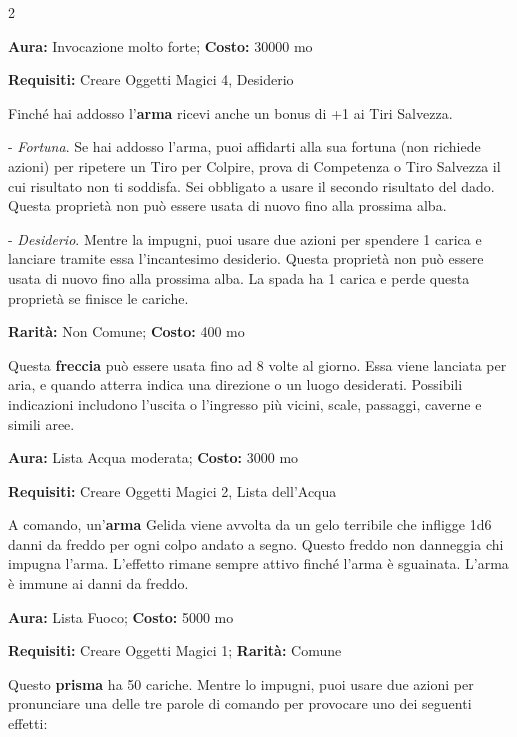 \begin{multicols}{2}

\textbf{Aura:} Invocazione molto forte; \textbf{Costo:} 30000 mo

\textbf{Requisiti:} Creare Oggetti Magici 4, Desiderio

Finché hai addosso l'\textbf{arma} ricevi anche un bonus di +1 ai Tiri Salvezza.

- \emph{Fortuna}. Se hai addosso l'arma, puoi affidarti alla sua fortuna (non richiede azioni) per ripetere un Tiro per Colpire, prova di Competenza o Tiro Salvezza il cui risultato non ti soddisfa. Sei obbligato a usare il secondo risultato del dado. Questa proprietà non può essere usata di nuovo fino alla prossima alba.

- \emph{Desiderio}. Mentre la impugni, puoi usare due azioni per spendere 1 carica e lanciare tramite essa l'incantesimo desiderio. Questa proprietà non può essere usata di nuovo fino alla prossima alba. La spada ha 1 carica e perde questa proprietà se finisce le cariche.


\textbf{Rarità:} Non Comune; \textbf{Costo:} 400 mo

Questa \textbf{freccia} può essere usata fino ad 8 volte al giorno. Essa viene lanciata per aria, e quando atterra indica una direzione o un luogo desiderati. Possibili indicazioni includono l'uscita o l'ingresso più vicini, scale, passaggi, caverne e simili aree.


\textbf{Aura:} Lista Acqua moderata; \textbf{Costo:} 3000 mo

\textbf{Requisiti:} Creare Oggetti Magici 2, Lista dell'Acqua

A comando, un'\textbf{arma} Gelida viene avvolta da un gelo terribile che infligge 1d6 danni da freddo per ogni colpo andato a segno. Questo freddo non danneggia chi impugna l'arma. L'effetto rimane sempre attivo finché l'arma è sguainata. L'arma è immune ai danni da freddo.


\textbf{Aura:} Lista Fuoco; \textbf{Costo:} 5000 mo

\textbf{Requisiti:} Creare Oggetti Magici 1; \textbf{Rarità:} Comune

Questo \textbf{prisma} ha 50 cariche. Mentre lo impugni, puoi usare due azioni per pronunciare una delle tre parole di comando per provocare uno dei seguenti effetti:


\end{multicols}
